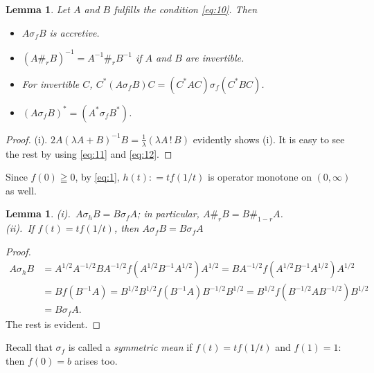 \documentclass[reqno]{amsart}
\newtheorem{lemma}[theorem]{Lemma}
\theoremstyle{definition}
\theoremstyle{remark}
\begin{document}
\begin{lemma}\label{Lem:5-0} Let $A$ and $B$ fulfills the 
condition \eqref{eq:10}. Then 
\begin{itemize}
\item[(i)]
 $A\sigma_f B$ is accretive.
\item[(ii)] $(A\#_r B)^{-1}= A^{-1} \#_r B^{-1}$ if $A$ and $B$ are invertible.
\item[(iii)]   For invertible $C$, 
$C^* (A\sigma_f B) C = (C^*A C)\sigma_f (C^* B C)$.
\item[(iv)]
$(A\sigma_f B)^* = (A^* \sigma_f B^*)$.
\end{itemize}
\end{lemma}
\begin{proof}
(i). $2A(\lambda A + B)^{-1} B=\frac{1}{\lambda} (\lambda A \,!\, B)$ evidently shows (i). It is easy to see the rest by using \eqref{eq:11} and \eqref{eq:12}.
\end{proof}
 Since $f(0)\geqq 0$, by \eqref{eq:1}, 
$h(t): = t f(1/t)$ is operator monotone on $(0,  \infty)$ as well. 
\begin{lemma}\label{Le:5-1}
{\rm (i)}.\, $A\sigma_h B = B\sigma_f A$; in particular,
$A\#_r B = B\#_{1-r} A$.\\
{\rm (ii)}.\, If $f(t)= t f(1/t)$, then $A\sigma_f B = B\sigma_f A$
\end{lemma}
\begin{proof}
\begin{align*}
A\sigma_h B & = A^{1/2}  A^{-1/2} B A^{-1/2} f( A^{1/2} B^{-1} A^{1/2}) A^{1/2}
= B A^{-1/2} f( A^{1/2} B^{-1} A^{1/2}) A^{1/2}\\
&= B f(B^{-1} A)= B^{1/2}B^{1/2}
f(B^{-1}A ) B^{-1/2} B^{1/2}= B^{1/2} f(B^{-1/2 }A B^{-1/2}) B^{1/2} \\
&=B\sigma_f A.
\end{align*}
The rest is evident. 
\end{proof}
Recall that $\sigma _f$ is called a {\it symmetric mean}  if 
$f(t)= t f(1/t)$ and $f(1)=1$: then $ f(0) = b$ arises too.
\end{document}
